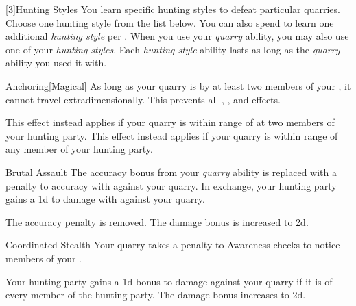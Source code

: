         [3]{Hunting Styles}
        You learn specific hunting styles to defeat particular quarries.
        Choose one hunting style from the list below.
        You can also spend  to learn one additional \textit{hunting style} per .
        When you use your \textit{quarry} ability, you may also use one of your \textit{hunting styles}.
        Each \textit{hunting style} ability lasts as long as the \textit{quarry} ability you used it with.
        {
            \begin{freeability}{Anchoring}[Magical]
                As long as your quarry is  by at least two members of your , it cannot travel extradimensionally.
                This prevents all , , and  effects.

                \rankline
                 This effect instead applies if your quarry is within \rngmed range of at two members of your hunting party.
                 This effect instead applies if your quarry is within \rnglong range of any member of your hunting party.
            \end{freeability}

            \begin{freeability}{Brutal Assault}
                The accuracy bonus from your \textit{quarry} ability is replaced with a  penalty to accuracy with  against your quarry.
                In exchange, your hunting party gains a \plus1d  to damage with  against your quarry.

                \rankline
                 The accuracy penalty is removed.
                 The damage bonus is increased to \plus2d.
            \end{freeability}

            \begin{freeability}{Coordinated Stealth}
                Your quarry takes a  penalty to Awareness checks to notice members of your .

                \rankline
                 Your hunting party gains a \plus1d bonus to damage against your quarry if it is \unaware of every member of the hunting party.
                 The damage bonus increases to \plus2d.
            \end{freeability}

}
